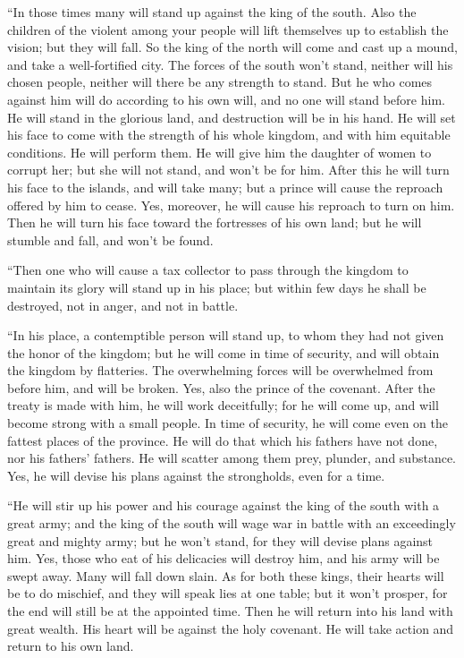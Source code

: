  ``In those times many will stand up against the king of
the south. Also the children of the violent among your people will lift
themselves up to establish the vision; but they will fall.
 So the king of the north will come and cast up a mound,
and take a well-fortified city. The forces of the south won't stand,
neither will his chosen people, neither will there be any strength to
stand.  But he who comes against him will do according to
his own will, and no one will stand before him. He will stand in the
glorious land, and destruction will be in his hand.  He
will set his face to come with the strength of his whole kingdom, and
with him equitable conditions. He will perform them. He will give him
the daughter of women to corrupt her; but she will not stand, and won't
be for him.  After this he will turn his face to the
islands, and will take many; but a prince will cause the reproach
offered by him to cease. Yes, moreover, he will cause his reproach to
turn on him.  Then he will turn his face toward the
fortresses of his own land; but he will stumble and fall, and won't be
found.

 ``Then one who will cause a tax collector to pass
through the kingdom to maintain its glory will stand up in his place;
but within few days he shall be destroyed, not in anger, and not in
battle.

 ``In his place, a contemptible person will stand up, to
whom they had not given the honor of the kingdom; but he will come in
time of security, and will obtain the kingdom by flatteries.
 The overwhelming forces will be overwhelmed from before
him, and will be broken. Yes, also the prince of the covenant.
 After the treaty is made with him, he will work
deceitfully; for he will come up, and will become strong with a small
people.  In time of security, he will come even on the
fattest places of the province. He will do that which his fathers have
not done, nor his fathers' fathers. He will scatter among them prey,
plunder, and substance. Yes, he will devise his plans against the
strongholds, even for a time.

 ``He will stir up his power and his courage against the
king of the south with a great army; and the king of the south will wage
war in battle with an exceedingly great and mighty army; but he won't
stand, for they will devise plans against him.  Yes,
those who eat of his delicacies will destroy him, and his army will be
swept away. Many will fall down slain.  As for both these
kings, their hearts will be to do mischief, and they will speak lies at
one table; but it won't prosper, for the end will still be at the
appointed time.  Then he will return into his land with
great wealth. His heart will be against the holy covenant. He will take
action and return to his own land.

